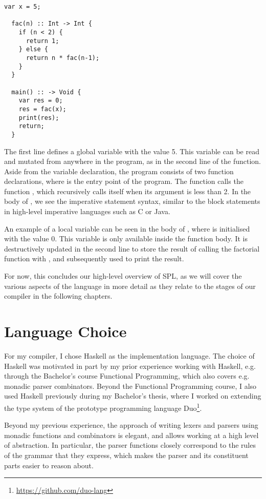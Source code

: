 \begin{lstlisting}[language=spl]
  var x = 5;

  fac(n) :: Int -> Int {
    if (n < 2) {
      return 1;
    } else {
      return n * fac(n-1);
    }
  }

  main() :: -> Void {
    var res = 0;
    res = fac(x);
    print(res);
    return;
  }
\end{lstlisting}

The first line defines a global variable  with the value 5.
This variable can be read and mutated from anywhere in the program, as in the
second line of the  function.
Aside from the variable declaration, the program consists of two function
declarations, where  is the entry point of the program.
The  function calls the function , which recursively
calls itself when its argument  is less than 2.
In the body of , we see the imperative statement syntax, similar to
the block statements in high-level imperative languages such as C or Java.

An example of a local variable can be seen in the body of , where
 is initialised with the value 0. This variable is only available
inside the function body.
It is destructively updated in the second line to store the result of calling
the factorial function with , and subsequently used to print the result.

For now, this concludes our high-level overview of SPL, as we will cover the
various aspects of the language in more detail as they relate to the stages of
our compiler in the following chapters.



\section{Language Choice} \label{sec:intro-lang-choice}

For my compiler, I chose Haskell as the implementation language. The choice
of Haskell was motivated in part by my prior experience working with Haskell,
e.g. through the Bachelor's course Functional Programming, which also covers e.g.
monadic parser combinators.
Beyond the Functional Programming course, I also used Haskell previously during
my Bachelor's thesis, where I worked on extending the type system of the prototype
programming language Duo\footnote{\url{https://github.com/duo-lang}}.

Beyond my previous experience, the approach of writing lexers and parsers using
monadic functions and combinators is elegant, and allows working at a high level
of abstraction. In particular, the parser functions closely correspond to the
rules of the grammar that they express, which makes the parser and its
constituent parts easier to reason about.

